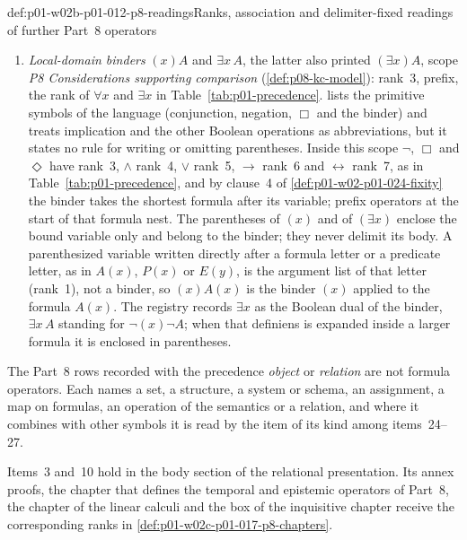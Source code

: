 \begin{hbconvention}{def:p01-w02b-p01-012-p8-readings}{Ranks, association and delimiter-fixed readings of further Part~8 operators}
\begin{enumerate}
\item \emph{Local-domain binders} \((x)A\) and \(\exists x\,A\), the
  latter also printed \((\exists x)A\), scope \emph{P8 Considerations
  supporting comparison} (\cref{def:p08-kc-model}): rank~3, prefix, the
  rank of \(\forall x\) and \(\exists x\) in
  Table~\ref{tab:p01-precedence}.   lists the
  primitive symbols of the language (conjunction, negation, \(\Box\) and
  the binder) and treats implication and the other Boolean operations as
  abbreviations, but it states no rule for writing or omitting
  parentheses.  Inside this scope \(\neg\), \(\Box\) and \(\Diamond\) have
  rank~3, \(\land\) rank~4, \(\lor\) rank~5, \(\to\) rank~6 and
  \(\leftrightarrow\) rank~7, as in Table~\ref{tab:p01-precedence}, and by
  clause~4 of \cref{def:p01-w02-p01-024-fixity} the binder takes the
  shortest formula after its variable; prefix operators at the start of
  that formula nest.  The parentheses of \((x)\) and of \((\exists x)\)
  enclose the bound variable only and belong to the binder; they never
  delimit its body.  A parenthesized variable written directly after a
  formula letter or a predicate letter, as in \(A(x)\), \(P(x)\) or
  \(E(y)\), is the argument list of that letter (rank~1), not a binder, so
  \((x)A(x)\) is the binder \((x)\) applied to the formula \(A(x)\).  The
  registry records \(\exists x\) as the Boolean dual of the binder,
  \(\exists x\,A\) standing for \(\neg(x)\neg A\); when that definiens is
  expanded inside a larger formula it is enclosed in parentheses.
\end{enumerate}
The Part~8 rows recorded with the precedence \emph{object} or
\emph{relation} are not formula operators.  Each names a set, a structure,
a system or schema, an assignment, a map on formulas, an operation of the
semantics or a relation, and where it combines with other symbols it is
read by the item of its kind among items~24--27.
\end{hbconvention}

Items~3 and~10 hold in the body section of the relational presentation.
Its annex proofs, the chapter that defines the temporal and epistemic
operators of Part~8, the chapter of the linear calculi and the box of the
inquisitive chapter receive the corresponding ranks in
\cref{def:p01-w02c-p01-017-p8-chapters}.

